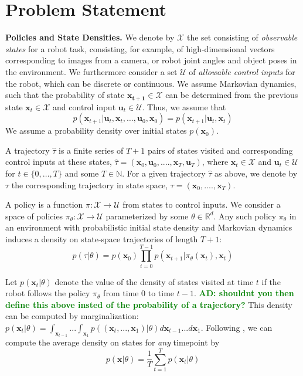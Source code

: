 \documentclass[10pt, conference]{ieeeconf}      %
\newcommand{\bu}{\mathbf{u}}
\newcommand{\bx}{\mathbf{x}}
\newcommand{\adnote}[1]{\ifthenelse{\boolean{include-notes}}%
 {\textcolor{green}{\textbf{AD: #1}}}{}}
\begin{document}
\section{Problem Statement}
\noindent\textbf{Policies and State Densities.}
We denote by $\mathcal{X}$ the set consisting of \emph{observable states} for a robot task, consisting, for example, of
high-dimensional vectors corresponding to images from a camera, or robot joint angles and object poses in the environment.
We furthermore consider a set $\mathcal{U}$ of \emph{allowable control inputs} for the robot, which can be discrete or
continuous. We assume Markovian dynamics, such that the probability of state $\mathbf{x_{t+1}}\in
\mathcal{X}$ can be determined from the previous state $\mathbf{x}_t\in\mathcal{X}$ and control input $\mathbf{u}_t\in
\mathcal{U}$. Thus, we assume that 
$$p(\bx_{t+1}|\bu_{t},\bx_{t}, \ldots, \bu_{0}, \bx_{0})=p(\bx_{t+1}|\bu_{t}, \bx_t)$$
We assume a probability density over initial states $p(\bx_0)$.

A trajectory $\hat{\tau}$ is a finite series of $T+1$ pairs of states visited and corresponding
control inputs at these states, $\hat{\tau} = (\mathbf{x}_0,\mathbf{u}_0, ...., \mathbf{x}_T,\mathbf{u}_T)$, where $\bx_t\in \mathcal{X}$
and $\bu_t\in \mathcal{U}$ for $t\in \{0, \ldots, T\}$ and some $T\in \mathbb{N}$.  
For a given trajectory $\hat{\tau}$ as above, we denote by ${\tau}$ the corresponding trajectory in state space,
${\tau} = (\bx_0,....,\bx_T)$.


A policy is a function $\pi: \mathcal{X} \to \mathcal{U}$ from states to control inputs. 
We consider a space of policies $\pi_{\theta}:\mathcal{X}\to \mathcal{U}$ parameterized by some $\theta\in \mathbb{R}^d$. Any such policy $\pi_{\theta}$ in an environment with probabilistic initial state density and Markovian dynamics
induces a density on state-space trajectories of length $T+1$: $$p(\tau | \theta)=
p(\bx_0)\prod_{i=0}^{T-1}p(\bx_{t+1}|\pi_{\theta}(\bx_t),\bx_t)$$


Let $p(\bx_t|\theta)$ denote the value of the density of states visited at time $t$ if the robot follows the policy
$\pi_{\theta}$ from time $0$ to time $t-1$.\adnote{shouldnt you then define this above insted of the probability of a trajectory?} This density can be computed by marginalization: $p(\bx_t|\theta) =
\int_{\bx_{t-1}}...\int_{\bx_1} p((\bx_t,...,\bx_1)|\theta) d\bx_{t-1}...d\bx_1$. Following \cite{ross2010reduction}, we can compute
the average density on states for \emph{any} timepoint by 
\begin{equation}
p(\bx|\theta) = \frac{1}{T} \sum^T_{t=1} p(\bx_t|\theta)
\label{eq:density}
\end{equation}
\end{document}
